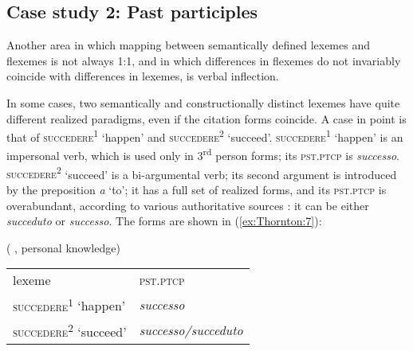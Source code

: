 \documentclass[output=paper]{langsci/langscibook}
\begin{document}
\subsection{Case study 2: Past
participles}\label{case-study-2-past-participles}

Another area in which mapping between semantically defined lexemes and
flexemes is not always 1:1, and in which differences in flexemes do not
invariably coincide with differences in lexemes, is verbal inflection.

In some cases, two semantically and constructionally distinct lexemes
have quite different realized paradigms, even if the citation forms
coincide. A case in point is that of 
\textsc{succedere\textsuperscript{1}} `happen' and
\textsc{succedere\textsuperscript{2}} `succeed'.
\textsc{succedere\textsuperscript{1}} `happen' is an impersonal verb,
which is used only in 3\textsuperscript{rd} person forms; its
\textsc{pst.ptcp} is \emph{successo}.
\textsc{succedere\textsuperscript{2}} `succeed' is a bi-argumental verb;
its second argument is introduced by the preposition \emph{a} `to'; it
has a full set of realized forms, and its \textsc{pst.ptcp} is
overabundant, according to various authoritative sources %
\citep{Zingarelli2016,Serianni1988}%
%
: it can be either \emph{succeduto} or
\emph{successo}. The forms are shown in (\ref{ex:Thornton:7}):


\ea\label{ex:Thornton:7}  %
(%
\citealt{Zingarelli2016,Serianni1988}%
%
, personal knowledge)
%

\begin{tabular}{@{}ll}
lexeme & \textsc{pst.ptcp}\\
\textsc{succedere\textsuperscript{1}} `happen' &\emph{successo}\\
\textsc{succedere\textsuperscript{2}} `succeed' &\emph{successo\slash{}succeduto}\\
\end{tabular}
\z
\end{document}
